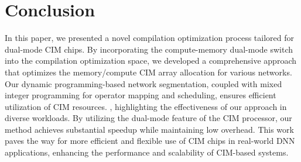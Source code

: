 

\section{Conclusion}
In this paper, we presented a novel compilation optimization process tailored for dual-mode CIM chips. By incorporating the compute-memory dual-mode switch into the compilation optimization space, we developed a comprehensive approach that optimizes the memory/compute CIM array allocation for various networks. Our dynamic programming-based network segmentation, coupled with mixed integer programming for operator mapping and scheduling, ensures efficient utilization of CIM resources. , highlighting the effectiveness of our approach in diverse workloads. By utilizing the dual-mode feature of the CIM processor, our method \name achieves substantial speedup while maintaining low overhead. This work paves the way for more efficient and flexible use of CIM chips in real-world DNN applications, enhancing the performance and scalability of CIM-based systems.
